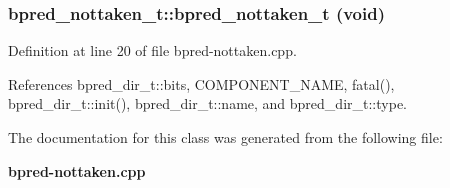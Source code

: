 \subsubsection[{bpred\_\-nottaken\_\-t}]{\setlength{\rightskip}{0pt plus 5cm}bpred\_\-nottaken\_\-t::bpred\_\-nottaken\_\-t (void)\hspace{0.3cm}{\tt  [inline]}}\label{classbpred__nottaken__t_f3f40d84bb725ed8b3db966dc6013721}




Definition at line 20 of file bpred-nottaken.cpp.

References bpred\_\-dir\_\-t::bits, COMPONENT\_\-NAME, fatal(), bpred\_\-dir\_\-t::init(), bpred\_\-dir\_\-t::name, and bpred\_\-dir\_\-t::type.

The documentation for this class was generated from the following file:\begin{CompactItemize}
\item 
{\bf bpred-nottaken.cpp}\end{CompactItemize}
